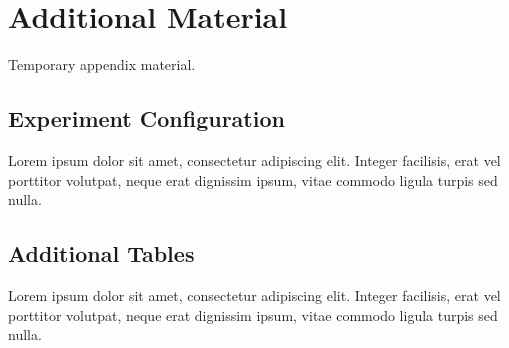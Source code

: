 \chapter{Additional Material}

Temporary appendix material.

\section{Experiment Configuration}

Lorem ipsum dolor sit amet, consectetur adipiscing elit. Integer facilisis, erat vel porttitor volutpat, neque erat dignissim ipsum, vitae commodo ligula turpis sed nulla.

\section{Additional Tables}

Lorem ipsum dolor sit amet, consectetur adipiscing elit. Integer facilisis, erat vel porttitor volutpat, neque erat dignissim ipsum, vitae commodo ligula turpis sed nulla.
